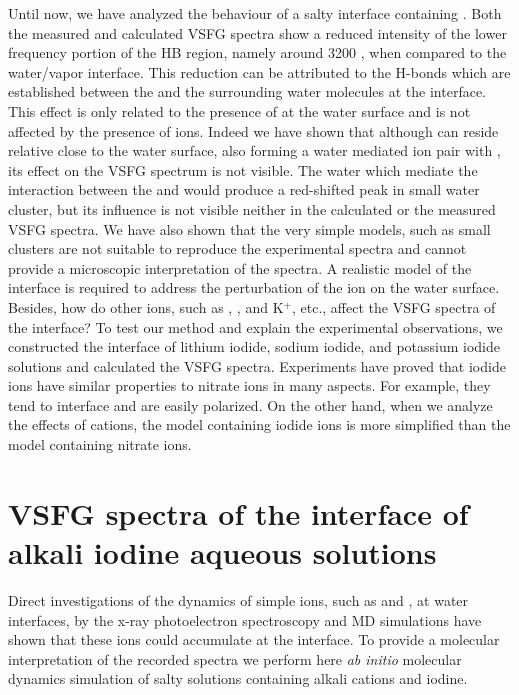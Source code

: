 Until now, we have analyzed the behaviour of a salty interface containing \LiN.
Both the measured and calculated VSFG spectra show a reduced intensity of the lower frequency portion of
the HB region, namely around 3200 \centimeter, when compared to the water/vapor interface. 
This reduction can be attributed to the H-bonds which are established between the \nitrate and the surrounding water molecules at the interface.
This effect is only related to the presence of \nitrate at the water surface and is not affected by the presence of \Li ions.
Indeed we have shown that although \Li can reside relative close to the water surface, also forming a water mediated
ion pair with \nit, its effect on the VSFG spectrum is not visible. The water which mediate the interaction 
between the \nitrate and \Li would produce a red-shifted peak in small water cluster, but its influence is not visible 
neither in the calculated or the measured VSFG spectra. We have also shown that the very simple models,
such as small clusters are not suitable to reproduce the experimental spectra and cannot provide a microscopic interpretation of the spectra. 
A realistic model of the interface is required to address the perturbation of the ion on the water surface.
Besides, how do other ions, such as \li, \na, and K$^+$, etc., affect the VSFG spectra of the interface? 
To test our method and explain the experimental observations, we constructed the interface of lithium iodide,
 sodium iodide, and potassium iodide solutions and calculated the VSFG spectra. 
Experiments have proved that iodide ions have similar properties to nitrate ions in many aspects. 
For example, they tend to interface and are easily polarized. 
On the other hand, when we analyze the effects of cations, the model containing iodide ions is more simplified than the model containing nitrate ions.

\section{VSFG spectra of the interface of alkali iodine aqueous solutions}\label{sfg_alkali_iodide_interface} %
Direct investigations of the dynamics of simple ions, such as \I and \br, at water interfaces, 
by the x-ray photoelectron spectroscopy \cite{ghosal2005} and MD simulations \cite{PJ01,PJ02} 
have shown that these ions could accumulate at the interface.
To provide a molecular interpretation of the recorded spectra we perform here \emph{ab initio} molecular dynamics simulation of salty solutions containing alkali cations
and iodine. %

